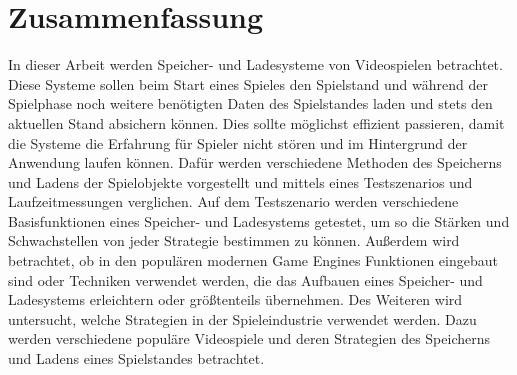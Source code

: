 \chapter*{Zusammenfassung}


In dieser Arbeit werden Speicher- und Ladesysteme von Videospielen betrachtet. Diese Systeme sollen beim Start eines Spieles den Spielstand und während der Spielphase noch weitere benötigten Daten des Spielstandes laden und stets den aktuellen Stand absichern können. Dies sollte möglichst effizient passieren, damit die Systeme die Erfahrung für Spieler nicht stören und im Hintergrund der Anwendung laufen können. Dafür werden verschiedene Methoden des Speicherns und Ladens der Spielobjekte vorgestellt und mittels eines Testszenarios und Laufzeitmessungen verglichen. Auf dem Testszenario werden verschiedene Basisfunktionen eines Speicher- und Ladesystems getestet, um so die Stärken und Schwachstellen von jeder Strategie bestimmen zu können. Außerdem wird betrachtet, ob in den populären modernen Game Engines Funktionen eingebaut sind oder Techniken verwendet werden, die das Aufbauen eines Speicher- und Ladesystems erleichtern oder größtenteils übernehmen. Des Weiteren wird untersucht, welche Strategien in der Spieleindustrie verwendet werden. Dazu werden verschiedene populäre Videospiele und deren Strategien des Speicherns und Ladens eines Spielstandes betrachtet.
